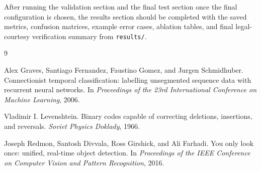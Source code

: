 \documentclass{article}
\begin{document}
After running the validation section and the final test section once the final configuration is chosen, the results section should be completed with the saved metrics, confusion matrices, example error cases, ablation tables, and final legal-courtesy verification summary from \texttt{results/}.

\begin{thebibliography}{9}

Alex Graves, Santiago Fernandez, Faustino Gomez, and Jurgen Schmidhuber.
\newblock Connectionist temporal classification: labelling unsegmented sequence data with recurrent neural networks.
\newblock In \emph{Proceedings of the 23rd International Conference on Machine Learning}, 2006.

Vladimir I. Levenshtein.
\newblock Binary codes capable of correcting deletions, insertions, and reversals.
\newblock \emph{Soviet Physics Doklady}, 1966.

Joseph Redmon, Santosh Divvala, Ross Girshick, and Ali Farhadi.
\newblock You only look once: unified, real-time object detection.
\newblock In \emph{Proceedings of the IEEE Conference on Computer Vision and Pattern Recognition}, 2016.

\end{thebibliography}
\end{document}
